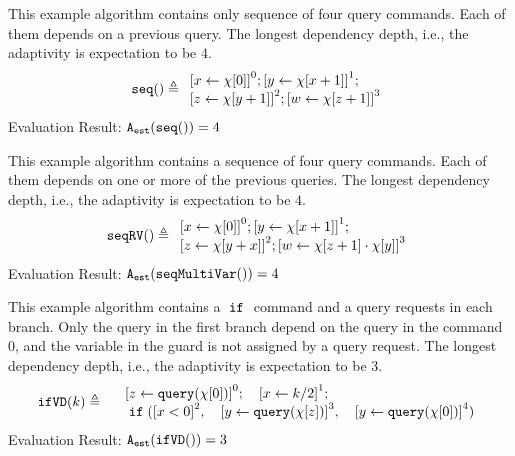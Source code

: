     \begin{example}
        \label{ex:seq}
        This example algorithm contains only sequence of four query commands.
        Each of them depends on a previous query.
        The longest dependency depth, i.e., the adaptivity is expectation to be $4$.
        \[
            \kw{seq()} \triangleq 
        \begin{array}{l} 
               \clabel{ \assign{x}{\chi[0]}}^{0} ; 
   \clabel{\assign{y}{\chi[x + 1]} }^{1} ; \\
   \clabel{\assign{z}{\chi[y + 1]}}^{2}; 
    \clabel{\assign{w}{\chi[z + 1]} }^{3}
            \end{array}
        \]
        Evaluation Result: $ {\mathtt{A_{est}}}( \mathtt{seq()}) = 4$
        \end{example}
    \begin{example}
        \label{ex:seqRV}
        This example algorithm contains a sequence of four query commands.
        Each of them depends on one or more of the previous queries.
        The longest dependency depth, i.e., the adaptivity is expectation to be $4$.
        \[
            \kw{seqRV()} \triangleq 
        \begin{array}{l} 
               \clabel{ \assign{x}{\chi[0]}}^{0} ;
   \clabel{\assign{y}{\chi[x + 1]} }^{1} ; \\
   \clabel{\assign{z}{\chi[y + x]}}^{2}; 
    \clabel{\assign{w}{\chi[z + 1] \cdot \chi[y]} }^{3}
            \end{array}
        \]
        Evaluation Result: $ {\mathtt{A_{est}}}(\mathtt{seqMultiVar()}) = 4$
    \end{example}
        \begin{example}
            \label{ex:ifVD}
            This example algorithm contains a $\;\mathtt{if}\;$ command and a query requests
            in each branch.
            Only the query in the first branch depend on the query in the command $0$,
            and the variable in the guard is not assigned by a query request.
            The longest dependency depth, i.e., the adaptivity is expectation to be $3$.
            \[
            \kw{ifVD}(k) \triangleq 
            \begin{array}{l}
               \quad \clabel{ \assign{z}{\query(\chi[0])}}^{0} ; 
               \quad \clabel{\assign{x}{k / 2} }^{1} ; \\
               \quad \eif(\clabel{x < 0}^2,
               \quad \clabel{\assign{y}{\query(\chi[z])}}^{3},
               \quad \clabel{\assign{y}{\query(\chi[0])}}^{4})
   \end{array}
            \]
            Evaluation Result: $ {\mathtt{A_{est}}}( \mathtt{ifVD()}) = 3$
        \end{example}
    
